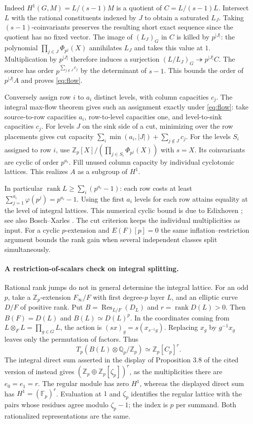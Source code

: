 \documentclass[11pt]{article}
\newcommand{\Z}{\mathbb Z}
\newcommand{\Q}{\mathbb Q}
\newcommand{\F}{\mathbb F}
\newcommand{\rk}{\operatorname{rank}}
\newcommand{\Ph}[1]{\Phi_{p^{#1}}}
\begin{document}
Indeed $H^1(G,M)=L/(s-1)M$ is a quotient of $C=L/(s-1)L$. Intersect
$L$ with the rational constituents indexed by $J$ to obtain a saturated
$L_J$. Taking $(s-1)$-coinvariants preserves the resulting short exact
sequence since the quotient has no fixed vector. The image of
$(L_J)_G$ in $C$ is killed by $p^{|J|}$: the polynomial
$\prod_{j\in J}\Ph{j}(X)$ annihilates $L_J$ and takes this value at $1$.
Multiplication by $p^{|J|}$ therefore induces a surjection
$(L/L_J)_G\twoheadrightarrow p^{|J|}C$. The source has order
$p^{\sum_{j\notin J}c_j}$ by the determinant of $s-1$. This bounds the
order of $p^{|J|}A$ and proves \eqref{eq:flow}.

Conversely assign row $i$ to $a_i$ distinct levels, with column
capacities $c_j$. The integral max-flow theorem gives such an
assignment exactly under \eqref{eq:flow}: take source-to-row
capacities $a_i$, row-to-level capacities one, and level-to-sink
capacities $c_j$. For levels $J$ on the sink side of a cut,
minimizing over the row placements gives cut capacity
$\sum_i\min(a_i,|J|)+\sum_{j\notin J}c_j$.
For the levels $S_i$ assigned to row $i$, use
$\Z_p[X]/(\prod_{j\in S_i}\Ph{j}(X))$ with $s=X$. Its coinvariants
are cyclic of order $p^{a_i}$. Fill unused column capacity by
individual cyclotomic lattices. This realizes $A$ as a subgroup of $H^1$.

In particular $\rk L\ge\sum_i(p^{a_i}-1)$: each row costs at least
$\sum_{j=1}^{a_i}\varphi(p^j)=p^{a_i}-1$. Using the first $a_i$
levels for each row attains equality at the level of integral lattices.
This numerical cyclic bound is due to Edixhoven
\cite[Lemma 4.5, Remark 4.6 and Corollary 4.7]{Ed}; see also
Bosch--Xarles \cite[Proposition 5.11]{BX}. The cut criterion keeps the
individual multiplicities as input. For a cyclic $p$-extension and
$E(F)[p]=0$ the same inflation--restriction argument bounds the rank
gain when several independent classes split simultaneously.

\paragraph{A restriction-of-scalars check on integral splitting.}
Rational rank jumps do not in general determine the integral lattice.
For an odd $p$, take a $\Z_p$-extension $F_\infty/F$ with first
degree-$p$ layer $L$, and an elliptic curve $D/F$ of positive rank.
Put $B=\operatorname{Res}_{L/F}(D_L)$ and $r=\rk D(L)>0$. Then
$B(F)=D(L)$ and $B(L)\simeq D(L)^p$. In the coordinates coming from
$L\otimes_F L=\prod_{g\in G}L$, the action is
$(s x)_g=s(x_{s^{-1}g})$. Replacing $x_g$ by $g^{-1}x_g$ leaves only
the permutation of factors. Thus
\[
 T_p(B(L)\otimes\Q_p/\Z_p)\simeq\Z_p[C_p]^r .
\]
The integral direct sum asserted in the display of Proposition 3.8 of
the cited version of \cite{Lim} instead gives
$(\Z_p\oplus\Z_p[\zeta_p])^r$, as the multiplicities there are
$e_0=e_1=r$. The regular module has zero $H^1$, whereas the displayed
direct sum has $H^1=(\F_p)^r$. Evaluation at $1$ and $\zeta_p$
identifies the regular lattice with the pairs whose residues agree
modulo $\zeta_p-1$; the index is $p$ per summand. Both rationalized
representations are the same.
\end{document}
